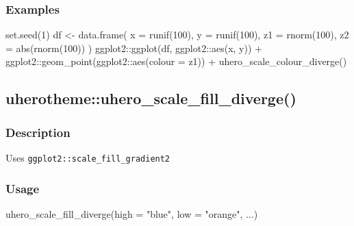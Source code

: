 \documentclass[
  letterpaper,
  DIV=11,
  numbers=noendperiod]{scrreport}
\newenvironment{Shaded}{\begin{snugshade}}{\end{snugshade}}
\newcommand{\AttributeTok}[1]{\textcolor[rgb]{0.40,0.45,0.13}{#1}}
\newcommand{\DecValTok}[1]{\textcolor[rgb]{0.68,0.00,0.00}{#1}}
\newcommand{\FunctionTok}[1]{\textcolor[rgb]{0.28,0.35,0.67}{#1}}
\newcommand{\NormalTok}[1]{\textcolor[rgb]{0.00,0.23,0.31}{#1}}
\newcommand{\OtherTok}[1]{\textcolor[rgb]{0.00,0.23,0.31}{#1}}
\newcommand{\SpecialCharTok}[1]{\textcolor[rgb]{0.37,0.37,0.37}{#1}}
\newcommand{\StringTok}[1]{\textcolor[rgb]{0.13,0.47,0.30}{#1}}
\begin{document}
\subsubsection{Examples}\label{examples-75}

\begin{Shaded}
\begin{Highlighting}[]
\FunctionTok{set.seed}\NormalTok{(}\DecValTok{1}\NormalTok{)}
\NormalTok{df }\OtherTok{\textless{}{-}} \FunctionTok{data.frame}\NormalTok{(}
 \AttributeTok{x =} \FunctionTok{runif}\NormalTok{(}\DecValTok{100}\NormalTok{),}
 \AttributeTok{y =} \FunctionTok{runif}\NormalTok{(}\DecValTok{100}\NormalTok{),}
 \AttributeTok{z1 =} \FunctionTok{rnorm}\NormalTok{(}\DecValTok{100}\NormalTok{),}
 \AttributeTok{z2 =} \FunctionTok{abs}\NormalTok{(}\FunctionTok{rnorm}\NormalTok{(}\DecValTok{100}\NormalTok{))}
\NormalTok{)}
\NormalTok{ggplot2}\SpecialCharTok{::}\FunctionTok{ggplot}\NormalTok{(df, ggplot2}\SpecialCharTok{::}\FunctionTok{aes}\NormalTok{(x, y)) }\SpecialCharTok{+}
\NormalTok{ggplot2}\SpecialCharTok{::}\FunctionTok{geom\_point}\NormalTok{(ggplot2}\SpecialCharTok{::}\FunctionTok{aes}\NormalTok{(}\AttributeTok{colour =}\NormalTok{ z1)) }\SpecialCharTok{+}
\FunctionTok{uhero\_scale\_colour\_diverge}\NormalTok{()}
\end{Highlighting}
\end{Shaded}

\subsection{uherotheme::uhero\_scale\_fill\_diverge()}\label{uherothemeuhero_scale_fill_diverge}

\subsubsection{Description}\label{description-76}

Uses \texttt{ggplot2::scale\_fill\_gradient2}

\subsubsection{Usage}\label{usage-76}

\begin{Shaded}
\begin{Highlighting}[]
\FunctionTok{uhero\_scale\_fill\_diverge}\NormalTok{(}\AttributeTok{high =} \StringTok{"blue"}\NormalTok{, }\AttributeTok{low =} \StringTok{"orange"}\NormalTok{, ...)}
\end{Highlighting}
\end{Shaded}
\end{document}
